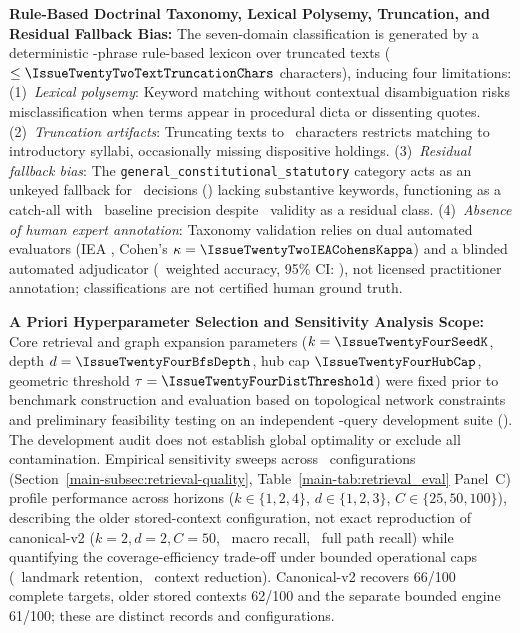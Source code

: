 \item \textbf{Rule-Based Doctrinal Taxonomy, Lexical Polysemy, Truncation, and Residual Fallback Bias:}
The seven-domain classification is generated by a deterministic \IssueTwentyTwoTotalLexiconPhrases-phrase rule-based lexicon over truncated texts ($\le \IssueTwentyTwoTextTruncationChars$ characters), inducing four limitations: (1)~\textit{Lexical polysemy}: Keyword matching without contextual disambiguation risks misclassification when terms appear in procedural dicta or dissenting quotes. (2)~\textit{Truncation artifacts}: Truncating texts to \IssueTwentyTwoTextTruncationChars\ characters restricts matching to introductory syllabi, occasionally missing dispositive holdings. (3)~\textit{Residual fallback bias}: The \texttt{general\_constitutional\_statutory} category acts as an unkeyed fallback for \IssueTwentyTwoGeneralConstitutionalCorpus\ decisions (\IssueTwentyTwoGeneralConstitutionalCorpusPct) lacking substantive keywords, functioning as a catch-all with \IssueTwentyTwoGeneralConstitutionalBaselineAcc\ baseline precision despite \IssueTwentyTwoFallbackValidityPct\ validity as a residual class. (4)~\textit{Absence of human expert annotation}: Taxonomy validation relies on dual automated evaluators (IEA \IssueTwentyTwoIEARawAgreement, Cohen's $\kappa=\IssueTwentyTwoIEACohensKappa$) and a blinded automated adjudicator (\IssueTwentyTwoHorvitzThompsonAccuracy\ weighted accuracy, 95\% CI: \IssueTwentyTwoHorvitzThompsonCI), not licensed practitioner annotation; classifications are not certified human ground truth.

\item \textbf{A Priori Hyperparameter Selection and Sensitivity Analysis Scope:} Core retrieval and graph expansion parameters ($k=\IssueTwentyFourSeedK$, depth $d=\IssueTwentyFourBfsDepth$, hub cap $\IssueTwentyFourHubCap$, geometric threshold $\tau=\IssueTwentyFourDistThreshold$) were fixed prior to benchmark construction and evaluation based on topological network constraints and preliminary feasibility testing on an independent \IssueTwentyFourDevQueryCount-query development suite (\IssueTwentyFourDevDate). The development audit does not establish global optimality or exclude all contamination. Empirical sensitivity sweeps across \IssueTwentySixConfigCount\ configurations (Section~\ref{main-subsec:retrieval-quality}, Table~\ref{main-tab:retrieval_eval} Panel~C) profile performance across horizons ($k \in \{1,2,4\}$, $d \in \{1,2,3\}$, $C \in \{25,50,100\}$), describing the older stored-context configuration, not exact reproduction of canonical-v2 ($k=2, d=2, C=50$, \IssueTwentySixHistMacro\ macro recall, \IssueTwentySixHistFullPath\ full path recall) while quantifying the coverage-efficiency trade-off under bounded operational caps (\IssueTwentySixGoldRetentionPct\ landmark retention, \IssueTwentySixContextReductionPct\ context reduction). Canonical-v2 recovers 66/100 complete targets, older stored contexts 62/100 and the separate bounded engine 61/100; these are distinct records and configurations.

